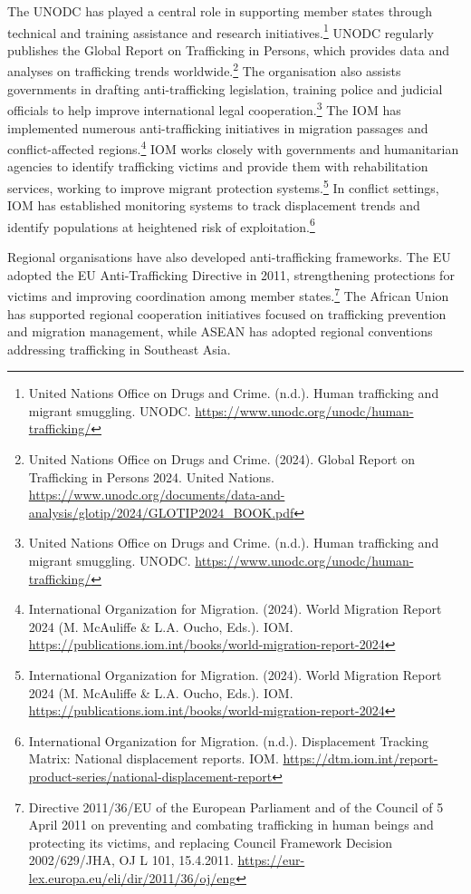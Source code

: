 The UNODC has played a central role in supporting member states through technical and training assistance and research initiatives.\footnote{United Nations Office on Drugs and Crime. (n.d.). Human trafficking and migrant smuggling. UNODC. \url{https://www.unodc.org/unodc/human-trafficking/}} UNODC regularly publishes the Global Report on Trafficking in Persons, which provides data and analyses on trafficking trends worldwide.\footnote{United Nations Office on Drugs and Crime. (2024). Global Report on Trafficking in Persons 2024. United Nations. \url{https://www.unodc.org/documents/data-and-analysis/glotip/2024/GLOTIP2024_BOOK.pdf}} The organisation also assists governments in drafting anti-trafficking legislation,  training  police  and  judicial  officials  to  help  improve international legal cooperation.\footnote{United Nations Office on Drugs and Crime. (n.d.). Human trafficking and migrant smuggling. UNODC. \url{https://www.unodc.org/unodc/human-trafficking/}} The IOM has implemented numerous anti-trafficking initiatives in migration passages and conflict-affected regions.\footnote{International Organization for Migration. (2024). World Migration Report 2024 (M. McAuliffe \& L.A. Oucho, Eds.). IOM. \url{https://publications.iom.int/books/world-migration-report-2024}} IOM works closely with governments and humanitarian agencies to identify trafficking victims and provide them with rehabilitation services, working to improve migrant protection systems.\footnote{International Organization for Migration. (2024). World Migration Report 2024 (M. McAuliffe \& L.A. Oucho, Eds.). IOM. \url{https://publications.iom.int/books/world-migration-report-2024}} In conflict settings, IOM has established monitoring systems to track displacement trends and identify populations at heightened risk of exploitation.\footnote{International Organization for Migration. (n.d.). Displacement Tracking Matrix: National displacement reports. IOM. \url{https://dtm.iom.int/report-product-series/national-displacement-report}}

Regional organisations have also developed anti-trafficking frameworks. The EU adopted the EU Anti-Trafficking Directive in 2011, strengthening protections for victims and improving coordination among member states.\footnote{Directive 2011/36/EU of the European Parliament and of the Council of 5 April 2011 on preventing and combating trafficking in human beings and protecting its victims, and replacing Council Framework Decision 2002/629/JHA, OJ L 101, 15.4.2011. \url{https://eur-lex.europa.eu/eli/dir/2011/36/oj/eng}} The African Union has supported regional cooperation initiatives focused on trafficking prevention and migration management, while ASEAN has adopted regional conventions addressing trafficking in Southeast Asia.

